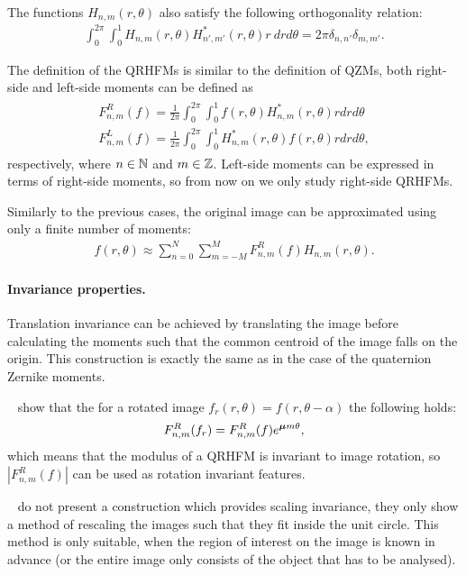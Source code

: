 The functions $H_{n,m}(r,\theta)$ also satisfy the following orthogonality relation:
\begin{gather*}
     \int_0^{2\pi} \int_0^1 H_{n,m}(r,\theta) H^*_{n',m'}(r,\theta) r \ dr d \theta = 2\pi\delta_{n,n'}\delta_{m,m'}.
\end{gather*}


The definition of the QRHFMs is similar to the definition of QZMs, both right-side and left-side moments can be defined as
\begin{gather} \label{eq:QRHFM}
    \begin{split}F_{n,m}^R(f) = \frac{1}{2\pi}\int_0^{2\pi} \int_0^1 f(r,\theta)H_{n,m}^*(r,\theta) r dr d \theta \\
    F_{n,m}^L(f) = \frac{1}{2\pi}\int_0^{2\pi} \int_0^1 H_{n,m}^*(r,\theta)f(r,\theta) r dr d \theta,
    \end{split}
\end{gather} respectively, where $n \in \mathbb{N}$ and $m \in \mathbb{Z}$. Left-side moments can be expressed in terms of right-side moments, so from now on we only study right-side QRHFMs.


Similarly to the previous cases, the original image can be approximated using only a finite number of moments: 
\begin{gather*}
      f(r,\theta) \approx \sum_{n=0}^{N}\sum_{m=-M}^{M}F_{n,m}^R(f)H_{n,m}(r,\theta).
\end{gather*}

\paragraph{Invariance properties.}
Translation invariance can be achieved by translating the image before calculating the moments such that the common centroid of the image falls on the origin. This construction is exactly the same as in the case of the quaternion Zernike moments.


\citeauthor{LiuAcc}~\cite{LiuAcc} show that the for a rotated image $f_r(r, \theta) = f(r, \theta - \alpha)$ the following holds:
\begin{gather*}
    F_{n,m}^R(f_r) = F_{n,m}^R(f) e^{\boldsymbol{\mu} m \theta},
\end{gather*}
which means that the modulus of a QRHFM is invariant to image rotation, so $|F_{n,m}^R(f)|$ can be used as rotation invariant features.


\citeauthor{LiuAcc}~\cite{LiuAcc} do not present a construction which provides scaling invariance, they only show a method of rescaling the images such that they fit inside the unit circle. This method is only suitable, when the region of interest on the image is known in advance (or the entire image only consists of the object that has to be analysed). 


